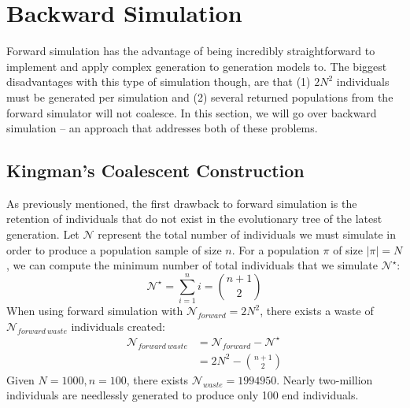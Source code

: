 
\section{Backward Simulation}\label{sec:backwardSimulation}
Forward simulation has the advantage of being incredibly straightforward to implement and apply complex generation to
generation models to.
The biggest disadvantages with this type of simulation though, are that (1) $2N^2$ individuals must
be generated per simulation and (2) several returned populations from the forward simulator will not coalesce.
In this section, we will go over backward simulation -- an approach that addresses both of these problems.

\subsection{Kingman's Coalescent Construction}\label{subsec:kingmanCoalescentConstruction}
As previously mentioned, the first drawback to forward simulation is the retention of individuals that do not exist in
the evolutionary tree of the latest generation.
Let $\mathcal{N}$ represent the total number of individuals we must simulate in order to produce a population sample of
size $n$.
For a population $\pi$ of size $|\pi| = N$, we can compute the minimum number of total individuals that we simulate
$\mathcal{N}^\star$:
\begin{equation}
    \mathcal{N}^\star = \sum_{i=1}^n i = \binom{n + 1}{2}
\end{equation}
When using forward simulation with $\mathcal{N}_{forward} = 2N^2$, there exists a waste of
$\mathcal{N}_{{forward \ waste}}$ individuals created:
\begin{equation}
    \begin{aligned}
        \mathcal{N}_{{forward \ waste}} &= \mathcal{N}_{forward} - \mathcal{N}^\star \\
        &= 2N^2 - \binom{n + 1}{2}
    \end{aligned}
\end{equation}
Given $N = 1000, n = 100$, there exists $\mathcal{N}_{waste} = 1994950$.
Nearly two-million individuals are needlessly generated to produce only 100 end individuals.

